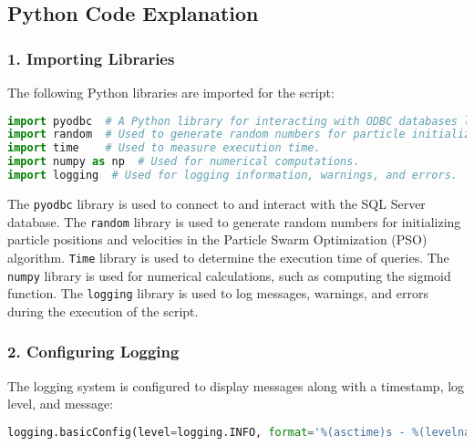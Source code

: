 


\lstset{style=mystyle}



\subsection*{Python Code Explanation}

\subsubsection*{1. Importing Libraries}
The following Python libraries are imported for the script:
\begin{lstlisting}[language=Python]
import pyodbc  # A Python library for interacting with ODBC databases like MSSQL.
import random  # Used to generate random numbers for particle initialization.
import time    # Used to measure execution time.
import numpy as np  # Used for numerical computations.
import logging  # Used for logging information, warnings, and errors.
\end{lstlisting}\vspace{.4cm}
The \texttt{pyodbc} library is used to connect to and interact with the SQL Server database. The \texttt{random} library is used to generate random numbers for initializing particle positions and velocities in the Particle Swarm Optimization (PSO) algorithm. \texttt{Time} library is used to determine the execution time of queries. The \texttt{numpy} library is used for numerical calculations, such as computing the sigmoid function. The \texttt{logging} library is used to log messages, warnings, and errors during the execution of the script.

\subsubsection*{2. Configuring Logging}
The logging system is configured to display messages along with a timestamp, log level, and message:
\begin{lstlisting}[language=Python]
logging.basicConfig(level=logging.INFO, format='%(asctime)s - %(levelname)s - %(message)s')
\end{lstlisting}\vspace{.4cm}

